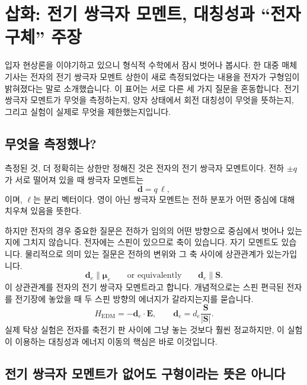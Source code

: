 \section{삽화: 전기 쌍극자 모멘트, 대칭성과 ``전자 구체'' 주장}

입자 현상론을 이야기하고 있으니 형식적 수학에서 잠시 벗어나 봅시다. 한 대중 매체 기사는 전자의 전기 쌍극자 모멘트 상한이 새로 측정되었다는 내용을 전자가 구형임이 밝혀졌다는 말로 소개했습니다. 이 표어는 서로 다른 세 가지 질문을 혼동합니다. 전기 쌍극자 모멘트가 무엇을 측정하는지, 양자 상태에서 회전 대칭성이 무엇을 뜻하는지, 그리고 실험이 실제로 무엇을 제한했는지입니다.

\subsection{무엇을 측정했나?}

측정된 것, 더 정확히는 상한만 정해진 것은 전자의 전기 쌍극자 모멘트이다. 전하 \(\pm q\)가 서로 떨어져 있을 때 쌍극자 모멘트는
\begin{equation}
\mathbf d = q\,\boldsymbol{\ell},
\end{equation}
이며, \(\boldsymbol{\ell}\)는 분리 벡터이다. 영이 아닌 쌍극자 모멘트는 전하 분포가 어떤 중심에 대해 치우쳐 있음을 뜻한다.

하지만 전자의 경우 중요한 질문은 전하가 임의의 어떤 방향으로 중심에서 벗어나 있는지에 그치지 않습니다. 전자에는 스핀이 있으므로 축이 있습니다. 자기 모멘트도 있습니다. 물리적으로 의미 있는 질문은 전하의 변위와 그 축 사이에 상관관계가 있는가입니다.
\begin{equation}
\mathbf d_e \parallel \boldsymbol{\mu}_e
\qquad \text{or equivalently} \qquad
\mathbf d_e \parallel \mathbf S .
\end{equation}
이 상관관계를 전자의 전기 쌍극자 모멘트라고 합니다. 개념적으로는 스핀 편극된 전자를 전기장에 놓았을 때 두 스핀 방향의 에너지가 갈라지는지를 묻습니다.
\begin{equation}
H_{\mathrm{EDM}}=-\mathbf d_e\cdot \mathbf E,
\qquad
\mathbf d_e=d_e\frac{\mathbf S}{|\mathbf S|}.
\end{equation}
실제 탁상 실험은 전자를 축전기 판 사이에 그냥 놓는 것보다 훨씬 정교하지만, 이 실험이 이용하는 대칭성과 에너지 이동의 핵심은 바로 이것입니다.

\subsection{전기 쌍극자 모멘트가 없어도 구형이라는 뜻은 아니다}

